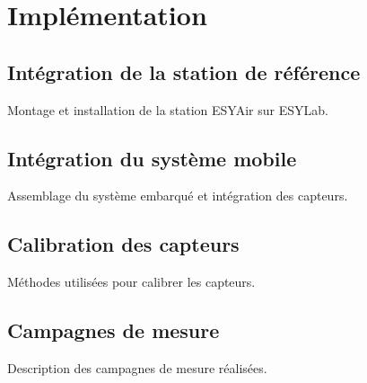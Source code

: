 \chapter{Implémentation}

\section{Intégration de la station de référence}

Montage et installation de la station ESYAir sur ESYLab.

\section{Intégration du système mobile}

Assemblage du système embarqué et intégration des capteurs.

\section{Calibration des capteurs}

Méthodes utilisées pour calibrer les capteurs.

\section{Campagnes de mesure}

Description des campagnes de mesure réalisées.